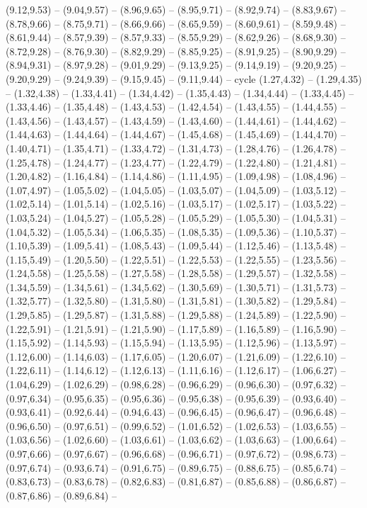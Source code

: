 \expandafter\def\csname geo:gebiet:DE-BE\endcsname{
  (9.12,9.53) -- (9.04,9.57) -- (8.96,9.65) -- (8.95,9.71) -- (8.92,9.74) -- (8.83,9.67) -- (8.78,9.66) -- (8.75,9.71) -- (8.66,9.66) -- (8.65,9.59) -- (8.60,9.61) -- (8.59,9.48) -- (8.61,9.44) -- (8.57,9.39) -- (8.57,9.33) -- (8.55,9.29) -- (8.62,9.26) -- (8.68,9.30) -- (8.72,9.28) -- (8.76,9.30) -- (8.82,9.29) -- (8.85,9.25) -- (8.91,9.25) -- (8.90,9.29) -- (8.94,9.31) -- (8.97,9.28) -- (9.01,9.29) -- (9.13,9.25) -- (9.14,9.19) -- (9.20,9.25) -- (9.20,9.29) -- (9.24,9.39) -- (9.15,9.45) -- (9.11,9.44) -- cycle}
\expandafter\def\csname geo:gebiet:DEU\endcsname{
  (1.27,4.32) -- (1.29,4.35) -- (1.32,4.38) -- (1.33,4.41) -- (1.34,4.42) -- (1.35,4.43) -- (1.34,4.44) -- (1.33,4.45) -- (1.33,4.46) -- (1.35,4.48) -- (1.43,4.53) -- (1.42,4.54) -- (1.43,4.55) -- (1.44,4.55) -- (1.43,4.56) -- (1.43,4.57) -- (1.43,4.59) -- (1.43,4.60) -- (1.44,4.61) -- (1.44,4.62) -- (1.44,4.63) -- (1.44,4.64) -- (1.44,4.67) -- (1.45,4.68) -- (1.45,4.69) -- (1.44,4.70) -- (1.40,4.71) -- (1.35,4.71) -- (1.33,4.72) -- (1.31,4.73) -- (1.28,4.76) -- (1.26,4.78) -- (1.25,4.78) -- (1.24,4.77) -- (1.23,4.77) -- (1.22,4.79) -- (1.22,4.80) -- (1.21,4.81) -- (1.20,4.82) -- (1.16,4.84) -- (1.14,4.86) -- (1.11,4.95) -- (1.09,4.98) -- (1.08,4.96) -- (1.07,4.97) -- (1.05,5.02) -- (1.04,5.05) -- (1.03,5.07) -- (1.04,5.09) -- (1.03,5.12) -- (1.02,5.14) -- (1.01,5.14) -- (1.02,5.16) -- (1.03,5.17) -- (1.02,5.17) -- (1.03,5.22) -- (1.03,5.24) -- (1.04,5.27) -- (1.05,5.28) -- (1.05,5.29) -- (1.05,5.30) -- (1.04,5.31) -- (1.04,5.32) -- (1.05,5.34) -- (1.06,5.35) -- (1.08,5.35) -- (1.09,5.36) -- (1.10,5.37) -- (1.10,5.39) -- (1.09,5.41) -- (1.08,5.43) -- (1.09,5.44) -- (1.12,5.46) -- (1.13,5.48) -- (1.15,5.49) -- (1.20,5.50) -- (1.22,5.51) -- (1.22,5.53) -- (1.22,5.55) -- (1.23,5.56) -- (1.24,5.58) -- (1.25,5.58) -- (1.27,5.58) -- (1.28,5.58) -- (1.29,5.57) -- (1.32,5.58) -- (1.34,5.59) -- (1.34,5.61) -- (1.34,5.62) -- (1.30,5.69) -- (1.30,5.71) -- (1.31,5.73) -- (1.32,5.77) -- (1.32,5.80) -- (1.31,5.80) -- (1.31,5.81) -- (1.30,5.82) -- (1.29,5.84) -- (1.29,5.85) -- (1.29,5.87) -- (1.31,5.88) -- (1.29,5.88) -- (1.24,5.89) -- (1.22,5.90) -- (1.22,5.91) -- (1.21,5.91) -- (1.21,5.90) -- (1.17,5.89) -- (1.16,5.89) -- (1.16,5.90) -- (1.15,5.92) -- (1.14,5.93) -- (1.15,5.94) -- (1.13,5.95) -- (1.12,5.96) -- (1.13,5.97) -- (1.12,6.00) -- (1.14,6.03) -- (1.17,6.05) -- (1.20,6.07) -- (1.21,6.09) -- (1.22,6.10) -- (1.22,6.11) -- (1.14,6.12) -- (1.12,6.13) -- (1.11,6.16) -- (1.12,6.17) -- (1.06,6.27) -- (1.04,6.29) -- (1.02,6.29) -- (0.98,6.28) -- (0.96,6.29) -- (0.96,6.30) -- (0.97,6.32) -- (0.97,6.34) -- (0.95,6.35) -- (0.95,6.36) -- (0.95,6.38) -- (0.95,6.39) -- (0.93,6.40) -- (0.93,6.41) -- (0.92,6.44) -- (0.94,6.43) -- (0.96,6.45) -- (0.96,6.47) -- (0.96,6.48) -- (0.96,6.50) -- (0.97,6.51) -- (0.99,6.52) -- (1.01,6.52) -- (1.02,6.53) -- (1.03,6.55) -- (1.03,6.56) -- (1.02,6.60) -- (1.03,6.61) -- (1.03,6.62) -- (1.03,6.63) -- (1.00,6.64) -- (0.97,6.66) -- (0.97,6.67) -- (0.96,6.68) -- (0.96,6.71) -- (0.97,6.72) -- (0.98,6.73) -- (0.97,6.74) -- (0.93,6.74) -- (0.91,6.75) -- (0.89,6.75) -- (0.88,6.75) -- (0.85,6.74) -- (0.83,6.73) -- (0.83,6.78) -- (0.82,6.83) -- (0.81,6.87) -- (0.85,6.88) -- (0.86,6.87) -- (0.87,6.86) -- (0.89,6.84) -- }
